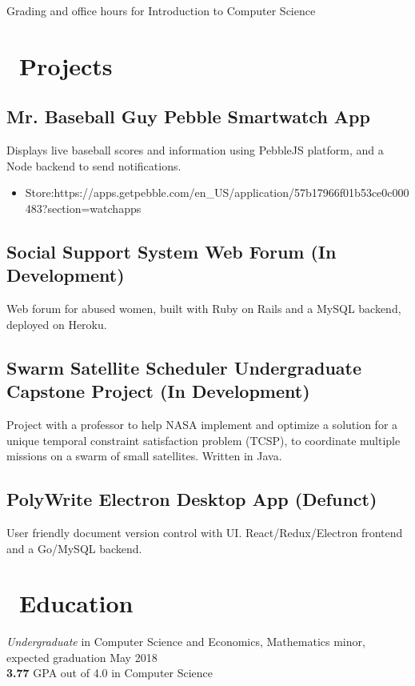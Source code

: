 \documentclass{resume}
\begin{document}
\space
Grading and office hours for Introduction to Computer Science


\section{\faWrench\ Projects}
\subsection{\textbf{Mr. Baseball Guy} Pebble Smartwatch App}
Displays live baseball scores and information using PebbleJS platform, and a Node backend to send notifications.
\begin{itemize}
  \item Store:\quad https://apps.getpebble.com/en\_US/application/57b17966f01b53ce0c000483?section=watchapps
\end{itemize}
\subsection{\textbf{Social Support System} Web Forum (In Development)}
Web forum for abused women, built with Ruby on Rails and a MySQL backend, deployed on Heroku.
\subsection{\textbf{Swarm Satellite Scheduler} Undergraduate Capstone Project (In Development)}
Project with a professor to help NASA implement and optimize a solution for a unique temporal constraint satisfaction problem (TCSP), to coordinate multiple missions on a swarm of small satellites. Written in Java. 
\subsection{\textbf{PolyWrite} Electron Desktop App (Defunct)}
User friendly document version control with UI. React/Redux/Electron frontend and a Go/MySQL backend.

\section{\faGraduationCap\ Education}
\textit{Undergraduate} in Computer Science and Economics, Mathematics minor, expected graduation May 2018 \\
\textbf{3.77} GPA out of 4.0 in Computer Science

%
%
\end{document}
